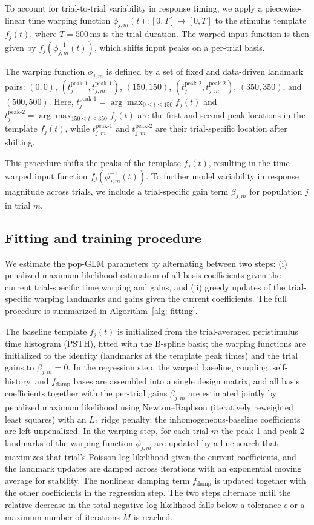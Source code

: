 \documentclass[12pt]{article}
\begin{document}
To account for trial-to-trial variability in response timing, we apply a piecewise-linear time warping function $\phi_{j,m}(t): [0, T] \rightarrow [0, T]$ to the stimulus template $f_j(t)$, where \( T = 500 \, \text{ms} \) is the trial duration. The warped input function is then given by \( f_j(\phi^{-1}_{j,m}(t)) \), which shifts input peaks on a per-trial basis.

The warping function $\phi_{j,m}$ is defined by a set of fixed and data-driven landmark pairs: $(0, 0)$, $(t_{j}^{\text{peak-1}}, t_{j,m}^{\text{peak-1}})$, $(150, 150)$, $(t_{j}^{\text{peak-2}}, t_{j,m}^{\text{peak-2}})$, $(350, 350)$, and $(500, 500)$. Here, $t_{j}^{\text{peak-1}} = \arg\max_{0 \leq t \leq 150} f_j(t)$ and $t_{j}^{\text{peak-2}} = \arg\max_{150 \leq t \leq 350} f_j(t)$ are the first and second peak locations in the template $f_j(t)$, while $t_{j,m}^{\text{peak-1}}$ and $t_{j,m}^{\text{peak-2}}$ are their trial-specific location after shifting.

This procedure shifts the peaks of the template $f_j(t)$, resulting in the time-warped input function $f_j(\phi^{-1}_{j,m}(t))$. To further model variability in response magnitude across trials, we include a trial-specific gain term $\beta_{j,m}$ for population $j$ in trial $m$.


\subsection{Fitting and training procedure}
\label{sec:fitting}

We estimate the pop-GLM parameters by alternating between two steps: (i) penalized maximum-likelihood estimation of all basis coefficients given the current trial-specific time warping and gains, and (ii) greedy updates of the trial-specific warping landmarks and gains given the current coefficients. The full procedure is summarized in Algorithm~\ref{alg: fitting}.

The baseline template $f_j(t)$ is initialized from the trial-averaged peristimulus time histogram (PSTH), fitted with the B-spline basis; the warping functions are initialized to the identity (landmarks at the template peak times) and the trial gains to $\beta_{j,m}=0$. In the regression step, the warped baseline, coupling, self-history, and $f_{\text{damp}}$ bases are assembled into a single design matrix, and all basis coefficients together with the per-trial gains $\beta_{j,m}$ are estimated jointly by penalized maximum likelihood using Newton--Raphson (iteratively reweighted least squares) with an $L_2$ ridge penalty; the inhomogeneous-baseline coefficients are left unpenalized. In the warping step, for each trial $m$ the peak-1 and peak-2 landmarks of the warping function $\phi_{j,m}$ are updated by a line search that maximizes that trial's Poisson log-likelihood given the current coefficients, and the landmark updates are damped across iterations with an exponential moving average for stability. The nonlinear damping term $f_{\text{damp}}$ is updated together with the other coefficients in the regression step. The two steps alternate until the relative decrease in the total negative log-likelihood falls below a tolerance $\epsilon$ or a maximum number of iterations $M$ is reached.
\end{document}

